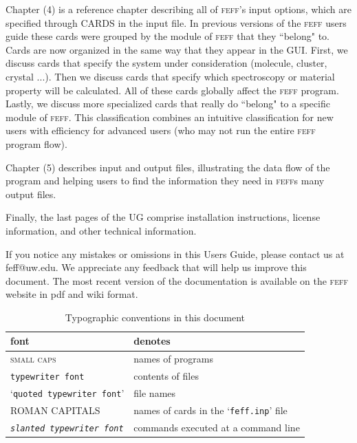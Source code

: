 \documentclass[11pt,oneside]{report} %
\renewcommand{\htmlref}[2]{\hyperlink{#2}{#1}}
\newcommand{\program}[1]{\textsc{#1}}
\newcommand{\feff}{\program{feff}}
\newcommand{\file}[1]{`\texttt{#1}'}
\renewcommand{\htmlref}[2]{{#1}} %
\begin{document}
\begin{latexonly}
Chapter (4) is a reference chapter describing all of \htmlref{{\feff}'s input options}{sec:Input-Control-Cards}, which are specified through CARDS in the input file.
In previous versions of the {\feff} users guide these cards were grouped by the module of {\feff} that they ``belong" to.  
Cards are now organized in the same way that they appear in the GUI.  First, we discuss cards that specify the
system under consideration (molecule, cluster, crystal ...).  Then we discuss cards that specify which spectroscopy or material property will be calculated.  All of these cards globally affect the
{\feff} program.  Lastly, we discuss more specialized cards that really do ``belong" to a specific module of {\feff}.  This classification combines an intuitive classification for new users with efficiency for advanced users (who may not run the entire {\feff} program flow).

Chapter (5) describes \htmlref{input and output files}{sec:Input-and-Output-Files}, illustrating the data flow of the program and helping users to find the information they need in {\feff}s many output files.

Finally, the last pages of the UG comprise \htmlref{installation instructions}{sec:Append-B-Inst}, license information, and other technical information.

If you notice any mistakes or omissions in this Users Guide, please contact us at \htmlref{feff@uw.edu}{mailto:feff@uw.edu}.  We appreciate any feedback that will help us improve this document.  The most recent version of the documentation is available on the \htmlref{{\feff} website} {http://www.feffgroup.org} in pdf and wiki format.




{}
\begin{table}[htbp]
  \caption{Typographic conventions in this document}
  \label{tab:typographic}
  \begin{center}
    \begin{tabular}[h]{ll}
      \hline\hline
      \quad font & \quad denotes \\
      \hline
      \program{small caps} & names of programs\\
      \texttt{typewriter font} &  contents of files\\
      \file{quoted typewriter font} & file names\\
      ROMAN CAPITALS & names of cards in the \file{feff.inp} file\\
      \texttt{\textsl{slanted typewriter font}} &
      commands executed at a command line \\
      \hline\hline
    \end{tabular}
  \end{center}
\end{table}
\end{latexonly} %
\end{document}
